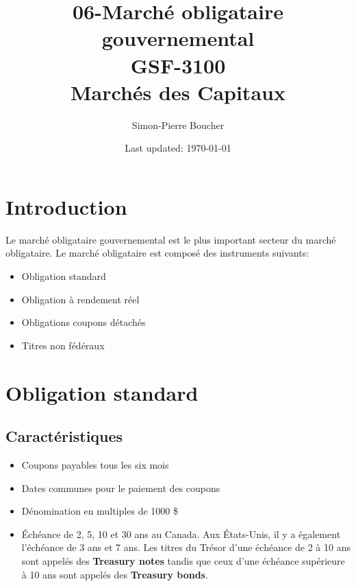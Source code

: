 \documentclass[letterpaper, 12pt]{article}
\newcommand{\1}{\mathds{1}}	%
\theoremstyle{definition}
\begin{document}

\title{06-Marché obligataire gouvernemental \\[1em]
\normalsize GSF-3100 \\ Marchés des Capitaux}


\author{\normalsize Simon-Pierre Boucher}
\date{\normalsize\vspace{-1ex} Last updated: \today}


\maketitle
\tableofcontents\label{sec:contents}


\newpage




\section{Introduction}
Le marché obligataire gouvernemental est le plus important secteur du marché obligataire.  Le marché obligataire est composé des instruments suivants:
\begin{itemize}
\item Obligation standard
\item Obligation à rendement réel
\item Obligations coupons détachés
\item Titres non fédéraux
\end{itemize}
\section{ Obligation standard}
\subsection{Caractéristiques}
\begin{itemize}
\item Coupons payables tous les six mois
\item Dates communes pour le paiement des coupons
\item  Dénomination en multiples de 1000 \$
\item Échéance de 2, 5, 10 et 30 ans au Canada.  Aux États-Unis, il y a également l’échéance de 3 ans et 7 ans.  Les titres du Trésor d’une échéance de 2 à 10 ans sont appelés des \textbf{Treasury notes} tandis que ceux d’une échéance supérieure à 10 ans sont appelés des  \textbf{Treasury bonds}.
\end{itemize}
\newpage
\end{document}
